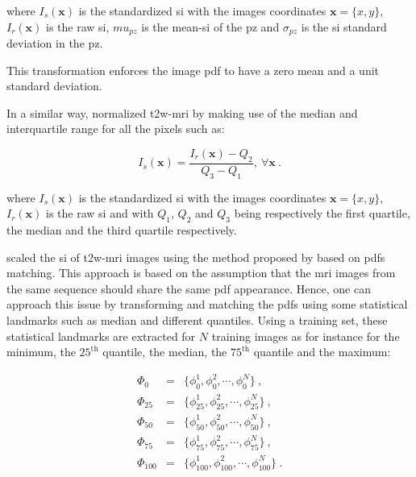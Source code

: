 \begin{enumerate}[leftmargin=*]
\noindent where $I_s(\mathbf{x})$ is the standardized \ac{si} with the images coordinates $\mathbf{x} = \{x,y\}$, $I_r(\mathbf{x})$ is the raw \ac{si}, $mu_{pz}$ is the mean-\ac{si} of the \ac{pz} and $\sigma_{pz}$ is the \ac{si} standard deviation in the \ac{pz}.

This transformation enforces the image \ac{pdf} to have a zero mean and a unit standard deviation.

In a similar way, \cite{Liu2013} normalized \ac{t2w}-\ac{mri} by making use of the median and interquartile range for all the pixels such as:

\begin{equation}
	I_s(\mathbf{x}) = \frac{ I_r(\mathbf{x}) - Q_2}{Q_3 - Q_1}, \ \forall \mathbf{x} \ .
	\label{eq:medsta}
\end{equation}

\noindent where $I_s(\mathbf{x})$ is the standardized \ac{si} with the images coordinates $\mathbf{x} = \{x,y\}$, $I_r(\mathbf{x})$ is the raw \ac{si} and with $Q_1$, $Q_2$ and $Q_3$ being respectively the first quartile, the median and the third quartile respectively.

\cite{Lv2009} scaled the \ac{si} of \ac{t2w}-\ac{mri} images using the method proposed by \cite{Nyul2000} based on \acp{pdf} matching. This approach is based on the assumption that the \ac{mri} images from the same sequence should share the same \ac{pdf} appearance. Hence, one can approach this issue by transforming and matching the \acp{pdf} using some statistical landmarks such as median and different quantiles. Using a training set, these statistical landmarks are extracted for $N$ training images as for instance for the minimum, the $25^{\text{th}}$ quantile, the median, the $75^{\text{th}}$ quantile and the maximum:

\begin{eqnarray}	
	\Phi_{0} & = & \{ \phi_{0}^{1}, \phi_{0}^{2}, \cdots, \phi_{0}^{N} \} \ , \nonumber \\
	\Phi_{25} & = & \{ \phi_{25}^{1}, \phi_{25}^{2}, \cdots, \phi_{25}^{N} \} \ , \nonumber \\
	\Phi_{50} & = & \{ \phi_{50}^{1}, \phi_{50}^{2}, \cdots, \phi_{50}^{N} \} \ ,  \label{eq:quantileStd} \\
	\Phi_{75} & = & \{ \phi_{75}^{1}, \phi_{75}^{2}, \cdots, \phi_{75}^{N} \} \ , \nonumber \\
	\Phi_{100} & = & \{ \phi_{100}^{1}, \phi_{100}^{2}, \cdots, \phi_{100}^{N} \} \ . \nonumber
\end{eqnarray}


\end{enumerate}
